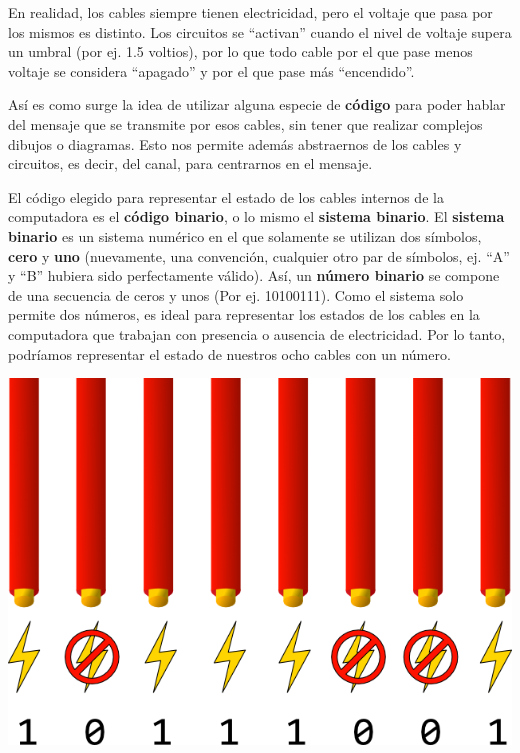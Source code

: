 \begin{knowwhat}[En realidad]
En realidad, los cables siempre tienen electricidad,
pero el voltaje que pasa por los mismos es distinto. Los circuitos se ``activan''
cuando el nivel de voltaje supera un umbral (por ej. 1.5 voltios), por lo que
todo cable por el que pase menos voltaje se considera ``apagado'' y por el que
pase más ``encendido''.
\end{knowwhat}

Así es como surge la idea de utilizar alguna especie de \textbf{código} para
poder hablar del mensaje que se transmite por esos cables, sin tener que realizar
complejos dibujos o diagramas. Esto nos permite además abstraernos de los cables
y circuitos, es decir, del canal, para centrarnos en el mensaje.

El código elegido para representar el estado de los cables internos de la
computadora es el \textbf{código binario}, o lo mismo el \textbf{sistema binario}.
El \textbf{sistema binario} es un sistema numérico en el que solamente se utilizan
dos símbolos, \textbf{cero} y \textbf{uno} (nuevamente, una convención, cualquier
otro par de símbolos, ej. ``A'' y ``B'' hubiera sido perfectamente válido).
Así, un \textbf{número binario} se compone de una secuencia de
ceros y unos (Por ej. 10100111). Como el sistema solo permite dos números, es
ideal para representar los estados de los cables en la computadora que trabajan
con presencia o ausencia de electricidad. Por lo tanto, podríamos representar
el estado de nuestros ocho cables con un número.

\centerline{\includegraphics[]{capitulos/bajo_nivel/imagenes/binary_cables_electricity.png}}

